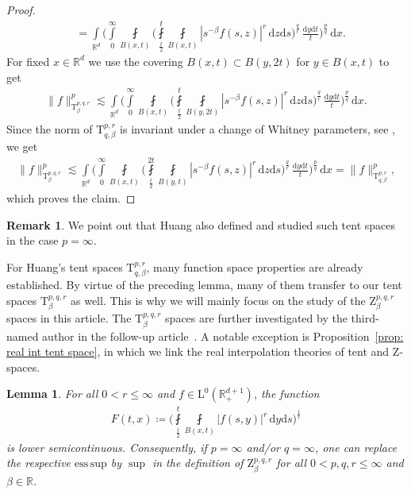 \documentclass[11pt, leqno,parskip=half]{amsart}
\newtheorem{lemma}[theorem]{Lemma}
\theoremstyle{definition}
\newtheorem{remark}[theorem]{Remark}
\newcommand{\IR}{\mathbb{R}}
\renewcommand{\L}{\mathrm{L}}
\renewcommand{\T}{\mathrm{T}}
\newcommand{\Z}{\mathrm{Z}}
\renewcommand{\d}{\mathrm{d}}
\newcommand{\esssup}{\mathrm{ess\, sup}}
\numberwithin{equation}{section}
\begin{document}
\begin{proof}
\begin{align*}
        &=\int\limits_{\IR^d}\bigg(\int\limits_0^\infty\fint\limits_{B(x,t)} \bigg(\fint\limits_{\frac{t}{2}}^{t} \fint\limits_{B(x,t)} |s^{-\beta}f(s,z)|^r \,\d z \d s\bigg)^\frac{q}{r}\,\frac{\d y\d t}{t}\bigg)^\frac{p}{q}\,\d x.
    \end{align*}
    For fixed $x\in\IR^d$ we use the covering $B(x,t)\subset B(y,2t)$ for $y\in B(x,t)$ to get
    \begin{align*}
        \|f\|_{\T^{p,q,r}_\beta}^p \lesssim \int\limits_{\IR^d}\bigg(\int\limits_0^\infty\fint\limits_{B(x,t)} \bigg(\fint\limits_{\frac{t}{2}}^{t} \fint\limits_{B(y,2t)} |s^{-\beta}f(s,z)|^r \,\d z \d s\bigg)^\frac{q}{r}\,\frac{\d y\d t}{t}\bigg)^\frac{p}{q}\,\d x.
    \end{align*}
    Since the norm
    of $\T^{p,r}_{q,\beta}$ is invariant under a change of Whitney parameters, see \cite[Obs.\@ 2.4]{Huang}, we get
    \begin{align*}
         \|f\|_{\T^{p,q,r}_\beta}^p \lesssim\int\limits_{\IR^d}\bigg(\int\limits_0^\infty\fint\limits_{B(x,t)} \bigg(\fint\limits_{\frac{t}{2}}^{2t} \fint\limits_{B(y,t)} |s^{-\beta}f(s,z)|^r \,\d z \d s\bigg)^\frac{q}{r}\,\frac{\d y\d t}{t}\bigg)^\frac{p}{q}\,\d x =\|f\|_{\T^{p,r}_{q,\beta}}^p,
    \end{align*}
    which proves the claim.
\end{proof}


\begin{remark}
    We point out that Huang also defined and studied such tent spaces in the case $p = \infty$.
\end{remark}

For Huang's tent spaces $\T^{p,r}_{q,\beta}$, many function space properties are already established. By virtue of the preceding lemma, many of them transfer to our tent spaces $\T^{p,q,r}_\beta$ as well. This is why we will mainly focus on the study of the $\Z^{p,q,r}_\beta$ spaces in this article. The $\T^{p,q,r}_\beta$ spaces are further investigated by the third-named author in the follow-up article~\cite{Haardt}.
A notable exception is Proposition~\ref{prop: real int tent space}, in which we link the real interpolation theories of tent and $\Z$-spaces.

\begin{lemma}
    For all $0<r\leq \infty$ and $f\in \L^0(\IR^{d+1}_+)$, the function
    \begin{align*}
        F(t,x) \coloneqq  \bigg(\fint\limits_{\frac{t}{2}}^{t} \fint\limits_{B(x,t)}|f(s,y)|^r\,\d y \d s\bigg)^\frac{1}{r}
    \end{align*}
    is lower semicontinuous. Consequently, if $p=\infty$ and/or $q=\infty$, one can replace the respective $\esssup$ by $\sup$ in the definition of $\Z^{p,q,r}_\beta$ for all $0<p,q,r\leq \infty$ and $\beta\in\IR$.
\end{lemma}
\end{document}
